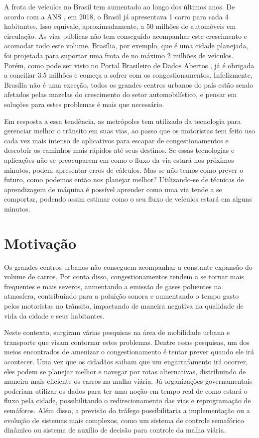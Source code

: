 A frota  de  veículos no Brasil tem aumentado ao longo  dos últimos anos. De acordo com a \acrfull{ANS} \cite{G1}, em 2018, o Brasil já apresentava 1 carro para cada 4 habitantes. Isso equivale, aproximadamente, a 50 milhões de automóveis em circulação. As vias públicas não tem conseguido acompanhar este crescimento e acomodar todo este volume. Brasília, por exemplo, que é uma cidade planejada, foi projetada para suportar uma frota de no máximo 2 milhões de veículos. Porém, como pode ser visto no Portal Brasileiro de Dados Abertos \cite{detran_2018}, já é obrigada a conciliar 3.5 milhões e começa a sofrer com os congestionamentos. Infelizmente, Brasília não é uma exceção, todos os grandes centros urbanos do país estão sendo afetados pelas mazelas do crescimento do setor automobilístico, e pensar em soluções para estes problemas é mais que necessário.


Em resposta a essa tendência, as metrópoles tem utilizado da tecnologia para gerenciar melhor o trânsito em suas vias, ao passo que os motoristas tem feito uso cada vez mais intenso de aplicativos para escapar de congestionamentos e descobrir os caminhos mais rápidos até seus destinos. Se essas tecnologias e aplicações não se preocuparem em como o fluxo da via estará nos próximos minutos, podem apresentar erros de cálculos. Mas se não temos como prever o futuro, como podemos então nos planejar melhor? Utilizando-se de técnicas de aprendizagem de máquina é possível aprender como uma via tende a se comportar, podendo assim estimar como o seu fluxo de veículos estará em alguns minutos.

\section{Motivação}

Os grandes centros urbanos não conseguem acompanhar a constante expansão do volume de carros. Por conta disso, congestionamentos tendem a se tornar mais frequentes e mais severos, aumentando a emissão de gases poluentes na atmosfera, contribuindo para a poluição sonora e aumentando o tempo gasto pelos motoristas no trânsito, impactando de maneira negativa na qualidade de vida da cidade e seus habitantes.

Neste contexto, surgiram várias pesquisas na área de mobilidade urbana e transporte que visam contornar estes problemas. Dentre essas pesquisas, um dos meios encontrados de amenizar o congestionamento é tentar prever quando ele irá acontecer. Uma vez que os cidadãos saibam que um engarrafamento irá ocorrer, eles podem se planejar melhor e navegar por rotas alternativas, distribuindo de maneira mais eficiente os carros na malha viária. Já organizações governamentais poderiam utilizar os dados para ter uma noção em tempo real de como estará o fluxo pela cidade, possibilitando o redirecionamento das vias e reprogramação de semáforos. Além disso, a previsão do tráfego possibilitaria a implementação ou a evolução de sistemas mais complexos, como um sistema de controle semafórico dinâmico ou sistema de auxílio de decisão para controle da malha viária.

